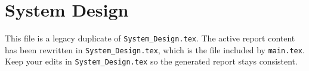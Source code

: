 \section{System Design}
\noindent This file is a legacy duplicate of \texttt{System\_Design.tex}. The active report content has been rewritten in \texttt{System\_Design.tex}, which is the file included by \texttt{main.tex}. Keep your edits in \texttt{System\_Design.tex} so the generated report stays consistent.
